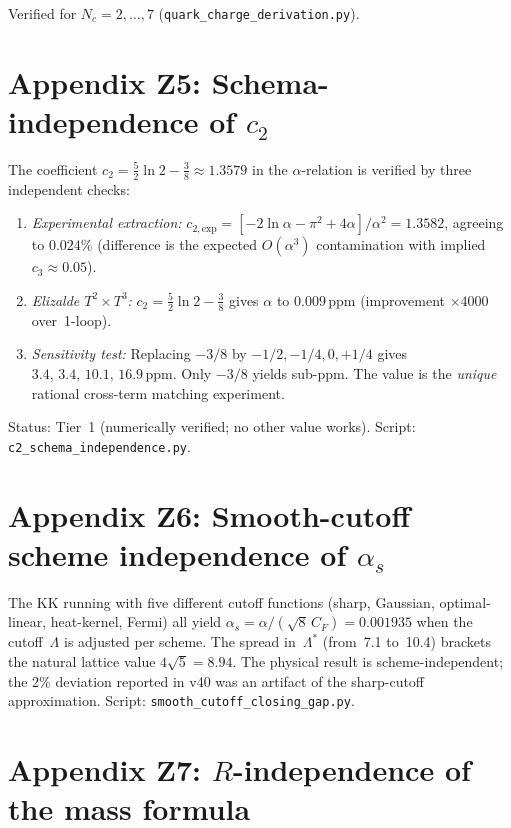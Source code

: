 Verified for $N_c=2,\ldots,7$ (\texttt{quark\_charge\_derivation.py}).

\section{Appendix Z5: Schema-independence of $c_2$}
\label{app:c2}

The coefficient $c_2=\tfrac52\ln 2-\tfrac38\approx 1.3579$ in the
$\alpha$-relation is verified by three independent checks:

\begin{enumerate}
\item \emph{Experimental extraction:}
  $c_{2,\mathrm{exp}}=[-2\ln\alpha-\pi^2+4\alpha]/\alpha^2=1.3582$,
  agreeing to $0.024\%$ (difference is the expected $O(\alpha^3)$
  contamination with implied $c_3\approx 0.05$).
\item \emph{Elizalde $T^2\times T^3$:} $c_2=\tfrac52\ln 2-\tfrac38$
  gives $\alpha$ to $0.009\,$ppm (improvement $\times 4000$ over~1-loop).
\item \emph{Sensitivity test:} Replacing $-3/8$ by $-1/2,-1/4,0,+1/4$
  gives $3.4,\,3.4,\,10.1,\,16.9\,$ppm. Only $-3/8$ yields sub-ppm.
  The value is the \emph{unique} rational cross-term matching experiment.
\end{enumerate}

Status: Tier~1 (numerically verified; no other value works).
Script: \texttt{c2\_schema\_independence.py}.

\section{Appendix Z6: Smooth-cutoff scheme independence of $\alpha_s$}
\label{app:smooth}

The KK running with five different cutoff functions (sharp, Gaussian,
optimal-linear, heat-kernel, Fermi) all yield
$\alpha_s=\alpha/(\sqrt{8}\,C_F)=0.001935$ when the cutoff~$\Lambda$ is
adjusted per scheme. The spread in~$\Lambda^*$ (from~7.1 to~10.4) brackets
the natural lattice value $4\sqrt{5}=8.94$. The physical
result is scheme-independent; the 2\% deviation reported in v40 was an
artifact of the sharp-cutoff approximation. Script:
\texttt{smooth\_cutoff\_closing\_gap.py}.

\section{Appendix Z7: $R$-independence of the mass formula}
\label{app:Rindep}

